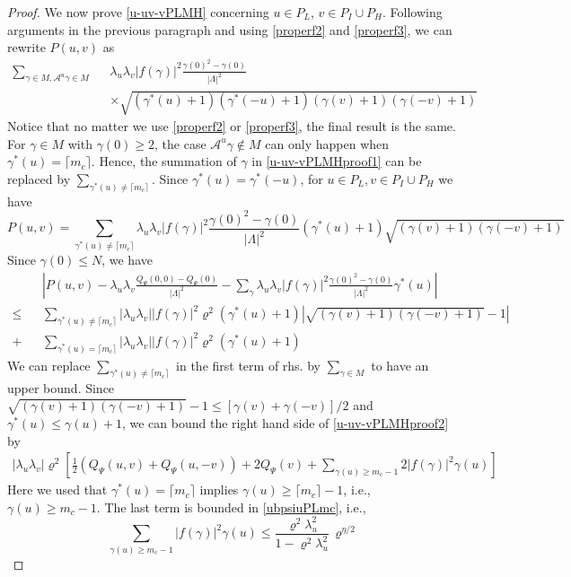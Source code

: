 \documentclass[11pt]{article}
\numberwithin{equation}{section}
\newcommand{\beq}{\begin{equation}}
\newcommand{\eeq}{\end{equation}}
\newcommand{\beqa}{\begin{eqnarray}}
\newcommand{\eeqa}{\end{eqnarray}}
\newcommand\half{\mbox{$\frac 12$}}
\renewcommand\rho\varrho
\theoremstyle{definition}
\begin{document}
\begin{proof}
We now prove \eqref{u-uv-vPLMH} concerning $u\in P_L$, $v\in P_I\cup P_H$. Following arguments in the previous paragraph and using  \eqref{properf2} and \eqref{properf3}, we can rewrite $P(u,v)$ as
\beqa\label{u-uv-vPLMHproof1}
\sum_{\gamma\in M, \mathcal A^{u} \gamma \in M}&&\lambda_u\lambda_v|f(\gamma)|^2\frac{\gamma(0)^2-\gamma(0)}{|\Lambda|^2}\\\nonumber
&&\times\sqrt{(\gamma^*(u)+1)(\gamma^*(-u)+1)(\gamma(v)+1)(\gamma(-v)+1)}
\eeqa 
Notice that no matter we use \eqref{properf2} or \eqref{properf3}, the final result is the same. 
For $\gamma\in M$ with $\gamma(0)\geq 2$,  the case $\mathcal A^{u}\gamma\notin M$  can only happen when $\gamma^*(u)=\lceil m_c\rceil$. Hence, the summation of $\gamma$ in \eqref{u-uv-vPLMHproof1} can be replaced by $\sum_{\gamma^*(u)\neq \lceil m_c\rceil}$. Since  $\gamma^*(u)=\gamma^*(-u)$, for  $u\in P_L,v\in P_I\cup P_H$ we have
\beq
P(u,v)=\!\!\!\!\!\sum_{\gamma^*(u)\neq \lceil m_c\rceil}\!\!\!\!\!\lambda_u\lambda_v|f(\gamma)|^2\frac{\gamma(0)^2\!-\!\gamma(0)}{|\Lambda|^2}(\gamma^*(u)+1)\sqrt{(\gamma(v)+1)(\gamma(-v)+1)}
\eeq
%
Since $\gamma(0)\leq N$, we have
\beqa\nonumber
&&\!\!\!\left|P(u,v)-\lambda_u\lambda_v\frac{Q_\Psi(0,0)\!-\!Q_\Psi(0)}{|\Lambda|^2}-\sum_{\gamma}\lambda_u\lambda_v|f(\gamma)|^2\frac{\gamma(0)^2-\gamma(0)}{|\Lambda|^2}\gamma^*(u)\right|
\\\nonumber
\leq&&\sum_{\gamma^*(u)\neq \lceil m_c\rceil}\left|\lambda_u\lambda_v\right||f(\gamma)|^2\rho^2(\gamma^*(u)+1)\left|\sqrt{(\gamma(v)+1)(\gamma(-v)+1)}-1\right|\\\label{u-uv-vPLMHproof2}
+&&\sum_{\gamma^*(u)=\lceil m_c\rceil}\left|\lambda_u\lambda_v\right||f(\gamma)|^2\rho^2\left(\gamma^*(u)+1\right)
\eeqa
We can replace $\sum_{\gamma^*(u)\neq \lceil m_c\rceil}$ in the first term of rhs.  by  $\sum_{\gamma\in M}$ to have an upper bound. Since  $\sqrt{(\gamma(v)+1)(\gamma(-v)+1)}-1\le [\gamma(v)+\gamma(-v)]/2$ and $\gamma^*(u)\leq \gamma(u)+1$, we can bound 
the right hand side of \eqref{u-uv-vPLMHproof2} by 
\beqa\label{u-uv-vPLMHproof3}
\left|\lambda_u\lambda_v\right|\rho^2\left[\half\left(Q_\Psi(u,v)+Q_\Psi(u,-v)\right)+2Q_\Psi(v)+\!\!\!\!\sum_{\gamma(u)\geq m_c-1}\!\!\!\!2|f(\gamma)|^2\gamma(u)\right]
\eeqa
Here we used that $\gamma^*(u)=\lceil m_c\rceil$ implies $\gamma(u)\geq\lceil m_c\rceil-1$, i.e., $\gamma(u)\geq m_c-1$.
The last term   is bounded  in \eqref{ubpsiuPLmc}, i.e.,
\beq\label{u-uv-vPLMHproof3.5}
\sum_{\gamma(u)\geq m_c-1}|f(\gamma)|^2\gamma(u)\leq \frac{\rho^2\lambda_u^2}{1-\rho^2\lambda_u^2}\, \rho^{\eta/2}
\eeq




\end{proof}
\end{document}
